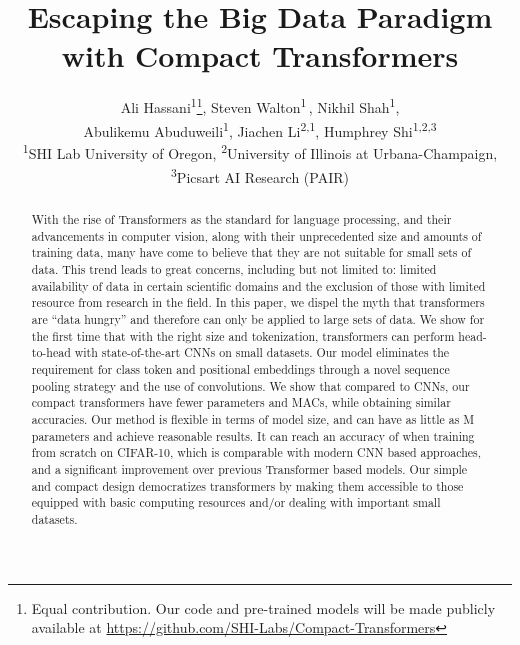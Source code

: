 \documentclass[10pt,twocolumn,letterpaper]{article}
\begin{document}
\title{Escaping the Big Data Paradigm with Compact Transformers}

\author{Ali Hassani\textsuperscript{1}\thanks{Equal contribution. Our code and pre-trained models will be made publicly available at \href{https://github.com/SHI-Labs/Compact-Transformers}{https://github.com/SHI-Labs/Compact-Transformers}}, Steven Walton\textsuperscript{1}\footnotemark[1] \,, Nikhil Shah\textsuperscript{1},\\Abulikemu Abuduweili\textsuperscript{1}, Jiachen Li\textsuperscript{2,1}, Humphrey Shi\textsuperscript{1,2,3} \\
{\small \textsuperscript{1}SHI Lab  University of Oregon, \textsuperscript{2}University of Illinois at Urbana-Champaign, \textsuperscript{3}Picsart AI Research (PAIR)}\\
}

\maketitle

\begin{abstract}
    With the rise of Transformers as the standard for language processing, and their advancements in computer vision, along with their unprecedented size and amounts of training data, many have come to believe that they are not suitable for small sets of data. This trend leads to great concerns, including but not limited to: limited availability of data in certain scientific domains and the exclusion of those with limited resource from research in the field.
    In this paper, we dispel the myth that transformers are ``data hungry'' and therefore can only be applied to large sets of data. 
    We show for the first time that with the right size and tokenization, transformers can perform head-to-head with state-of-the-art CNNs on small datasets.
    Our model eliminates the requirement for class token and positional embeddings through a novel sequence pooling strategy and the use of convolutions. 
    We show that compared to CNNs, our compact transformers have fewer parameters and MACs, while obtaining similar accuracies. 
    Our method is flexible in terms of model size, and can have as little as  M parameters  and achieve reasonable results.
    It can reach an accuracy of  when training from scratch on CIFAR-10, which is comparable with modern CNN based approaches, and a significant improvement over previous Transformer based models.
     Our simple and compact design democratizes transformers by making them accessible to those equipped with basic computing resources and/or dealing with important small datasets.
\end{abstract}
\end{document}

